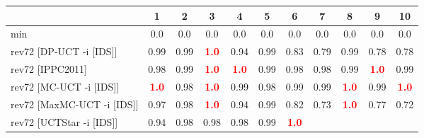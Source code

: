 \documentclass{article}
\begin{document}
\begin{tabular}{|l|r@{$\pm$}rr@{$\pm$}rr@{$\pm$}rr@{$\pm$}rr@{$\pm$}rr@{$\pm$}rr@{$\pm$}rr@{$\pm$}rr@{$\pm$}rr@{$\pm$}r|}
\hline

& \multicolumn{2}{c}{1}
& \multicolumn{2}{c}{2}
& \multicolumn{2}{c}{3}
& \multicolumn{2}{c}{4}
& \multicolumn{2}{c}{5}
& \multicolumn{2}{c}{6}
& \multicolumn{2}{c}{7}
& \multicolumn{2}{c}{8}
& \multicolumn{2}{c}{9}
& \multicolumn{2}{c|}{10}
\\
\hline
\hline
min
& \multicolumn{2}{c}{0.0}
& \multicolumn{2}{c}{0.0}
& \multicolumn{2}{c}{0.0}
& \multicolumn{2}{c}{0.0}
& \multicolumn{2}{c}{0.0}
& \multicolumn{2}{c}{0.0}
& \multicolumn{2}{c}{0.0}
& \multicolumn{2}{c}{0.0}
& \multicolumn{2}{c}{0.0}
& \multicolumn{2}{c|}{0.0}
\\
rev72 [DP-UCT -i [IDS]]
& \multicolumn{2}{c}{0.99}
& \multicolumn{2}{c}{0.99}
& \multicolumn{2}{c}{\textbf{\textcolor{red}{1.0}}}
& \multicolumn{2}{c}{0.94}
& \multicolumn{2}{c}{0.99}
& \multicolumn{2}{c}{0.83}
& \multicolumn{2}{c}{0.79}
& \multicolumn{2}{c}{0.99}
& \multicolumn{2}{c}{0.78}
& \multicolumn{2}{c|}{0.78}
\\
rev72 [IPPC2011]
& \multicolumn{2}{c}{0.98}
& \multicolumn{2}{c}{0.99}
& \multicolumn{2}{c}{\textbf{\textcolor{red}{1.0}}}
& \multicolumn{2}{c}{\textbf{\textcolor{red}{1.0}}}
& \multicolumn{2}{c}{0.99}
& \multicolumn{2}{c}{0.98}
& \multicolumn{2}{c}{0.98}
& \multicolumn{2}{c}{0.99}
& \multicolumn{2}{c}{\textbf{\textcolor{red}{1.0}}}
& \multicolumn{2}{c|}{0.99}
\\
rev72 [MC-UCT -i [IDS]]
& \multicolumn{2}{c}{\textbf{\textcolor{red}{1.0}}}
& \multicolumn{2}{c}{0.98}
& \multicolumn{2}{c}{\textbf{\textcolor{red}{1.0}}}
& \multicolumn{2}{c}{0.99}
& \multicolumn{2}{c}{0.98}
& \multicolumn{2}{c}{0.99}
& \multicolumn{2}{c}{0.99}
& \multicolumn{2}{c}{\textbf{\textcolor{red}{1.0}}}
& \multicolumn{2}{c}{0.99}
& \multicolumn{2}{c|}{\textbf{\textcolor{red}{1.0}}}
\\
rev72 [MaxMC-UCT -i [IDS]]
& \multicolumn{2}{c}{0.97}
& \multicolumn{2}{c}{0.98}
& \multicolumn{2}{c}{\textbf{\textcolor{red}{1.0}}}
& \multicolumn{2}{c}{0.94}
& \multicolumn{2}{c}{0.99}
& \multicolumn{2}{c}{0.82}
& \multicolumn{2}{c}{0.73}
& \multicolumn{2}{c}{\textbf{\textcolor{red}{1.0}}}
& \multicolumn{2}{c}{0.77}
& \multicolumn{2}{c|}{0.72}
\\
rev72 [UCTStar -i [IDS]]
& \multicolumn{2}{c}{0.94}
& \multicolumn{2}{c}{0.98}
& \multicolumn{2}{c}{0.98}
& \multicolumn{2}{c}{0.98}
& \multicolumn{2}{c}{0.99}
& \multicolumn{2}{c}{\textbf{\textcolor{red}{1.0}}}

\end{tabular}
\end{document}
